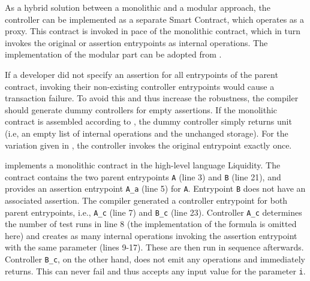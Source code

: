 As a hybrid solution between a monolithic and a modular approach, the controller can be implemented as a separate Smart Contract, which operates as a proxy. This contract is invoked in pace of the monolithic contract, which in turn invokes the original or assertion entrypoints as internal operations. The implementation of the modular part can be adopted from .

If a developer did not specify an assertion for all entrypoints of the parent contract, invoking their non-existing controller entrypoints would cause a transaction failure. To avoid this and thus increase the robustness, the compiler should generate dummy controllers for empty assertions. If the monolithic contract is assembled according to , the dummy controller simply returns unit (i.e, an empty list of internal operations and the unchanged storage). For the variation given in , the controller invokes the original entrypoint exactly once.

 implements a monolithic contract in the high-level language Liquidity. The contract contains the two parent entrypoints \texttt{A} (line 3) and \texttt{B} (line 21), and provides an assertion entrypoint \texttt{A\_a} (line 5) for \texttt{A}. Entrypoint \texttt{B} does not have an associated assertion. The compiler generated a controller entrypoint for both parent entrypoints, i.e., \texttt{A\_c} (line 7) and \texttt{B\_c} (line 23). Controller \texttt{A\_c} determines the number of test runs in line 8 (the implementation of the formula is omitted here) and creates as many internal operations invoking the assertion entrypoint with the same parameter (lines 9-17). These are then run in sequence afterwards. Controller \texttt{B\_c}, on the other hand, does not emit any operations and immediately returns. This can never fail and thus accepts any input value for the parameter \texttt{i}.


